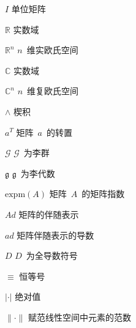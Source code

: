 \begin{denotation}
        \item[$I$]                       单位矩阵
        \item[$\mathbb{R}$]              实数域
        \item[$\mathbb{R}^n$]           $n$~维实欧氏空间
        \item[$\mathbb{C}$]              实数域
        \item[$\mathbb{C}^n$]          $n$~维复欧氏空间
        \item[$\wedge$]					楔积
        \item[$a^T$]          矩阵~$a$~的转置
        \item[$\mathcal{G}$]              $\mathcal{G}$~为李群
        \item[$\mathfrak{g}$]              $\mathfrak{g}$~为李代数
        \item[$\mbox{expm}(A)$]                矩阵~$A$~的矩阵指数
        \item[$Ad$]           矩阵的伴随表示
        \item[$ad$]          矩阵伴随表示的导数
        \item[$D$]			$D$~为全导数符号
        \item[$\equiv$]                  恒等号
        \item[$| \cdot |$]               绝对值
        \item[$\| \cdot \|$]             赋范线性空间中元素的范数


\end{denotation}